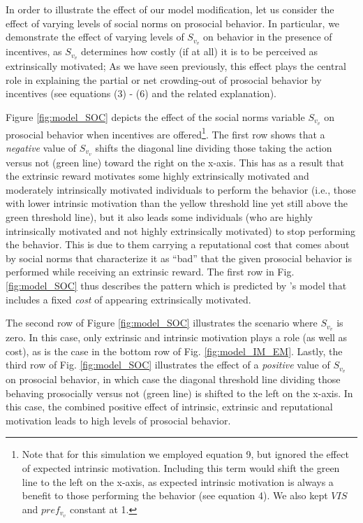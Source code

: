 \documentclass[AER]{AEA}
\begin{document}
In order to illustrate the effect of our model modification, let us consider the effect of varying levels of social norms on prosocial behavior. In particular, we demonstrate the effect of varying levels of $S_{v_{v}}$ on behavior in the presence of incentives, as $S_{v_{v}}$ determines how costly (if at all) it is to be perceived as extrinsically motivated; As we have seen previously, this effect plays the central role in explaining the partial or net crowding-out of prosocial behavior by incentives (see equations (3) - (6) and the related explanation).

Figure \ref{fig:model_SOC} depicts the effect of the social norms variable $S_{v_{v}}$ on prosocial behavior when incentives are offered\footnote{Note that for this simulation we employed equation 9, but ignored the effect of expected intrinsic motivation. Including this term would shift the green line to the left on the x-axis, as expected intrinsic motivation is always a benefit to those performing the behavior (see equation 4). We also kept $VIS$ and $pref_{v_{v}}$ constant at 1.}. The first row shows that a \textit{negative} value of $S_{v_{v}}$ shifts the diagonal line dividing those taking the action versus not (green line) toward the right on the x-axis. This has as a result that the extrinsic reward motivates some highly extrinsically motivated and moderately intrinsically motivated individuals to perform the behavior (i.e., those with lower intrinsic motivation than the yellow threshold line yet still above the green threshold line), but it also leads some individuals (who are highly intrinsically motivated and not highly extrinsically motivated) to stop performing the behavior. This is due to them carrying a reputational cost that comes about by social norms that characterize it as “bad” that the given prosocial behavior is performed while receiving an extrinsic reward. The first row in Fig. \ref{fig:model_SOC} thus describes the pattern which is predicted by \citeauthor{benabou_incentives_2006}'s \citeyearpar{benabou_incentives_2006} model that includes a fixed \textit{cost} of appearing extrinsically motivated.


The second row of Figure \ref{fig:model_SOC} illustrates the scenario where $S_{v_{v}}$ is zero. In this case, only extrinsic and intrinsic motivation plays a role (as well as cost), as is the case in the bottom row of Fig. \ref{fig:model_IM_EM}. Lastly, the third row of Fig. \ref{fig:model_SOC} illustrates the effect of a \textit{positive} value of $S_{v_{v}}$ on prosocial behavior, in which case the diagonal threshold line dividing those behaving prosocially versus not (green line) is shifted to the left on the x-axis. In this case, the combined positive effect of intrinsic, extrinsic and reputational motivation leads to high levels of prosocial behavior.
\end{document}
